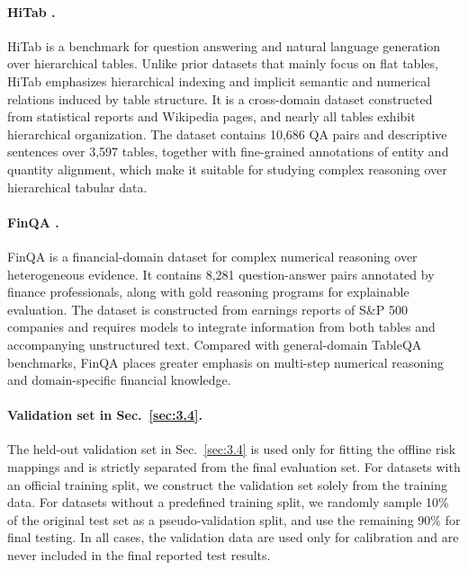 \documentclass[11pt]{article}
\begin{document}
\vspace{-4pt}

\paragraph{HiTab \citep{cheng-etal-2022-hitab}.}
HiTab is a benchmark for question answering and natural language generation over hierarchical tables. Unlike prior datasets that mainly focus on flat tables, HiTab emphasizes hierarchical indexing and implicit semantic and numerical relations induced by table structure. It is a cross-domain dataset constructed from statistical reports and Wikipedia pages, and nearly all tables exhibit hierarchical organization. The dataset contains 10,686 QA pairs and descriptive sentences over 3,597 tables, together with fine-grained annotations of entity and quantity alignment, which make it suitable for studying complex reasoning over hierarchical tabular data.

\vspace{-4pt}

\paragraph{FinQA \citep{chen-etal-2021-finqa}.}
FinQA is a financial-domain dataset for complex numerical reasoning over heterogeneous evidence. It contains 8,281 question-answer pairs annotated by finance professionals, along with gold reasoning programs for explainable evaluation. The dataset is constructed from earnings reports of S\&P 500 companies and requires models to integrate information from both tables and accompanying unstructured text. Compared with general-domain TableQA benchmarks, FinQA places greater emphasis on multi-step numerical reasoning and domain-specific financial knowledge.

\vspace{-4pt}

\paragraph{Validation set in Sec.~\ref{sec:3.4}.}
The held-out validation set in Sec.~\ref{sec:3.4} is used only for fitting the offline risk mappings and is strictly separated from the final evaluation set. For datasets with an official training split, we construct the validation set solely from the training data. For datasets without a predefined training split, we randomly sample 10\% of the original test set as a pseudo-validation split, and use the remaining 90\% for final testing. In all cases, the validation data are used only for calibration and are never included in the final reported test results.
\vspace{-3pt}
\end{document}
